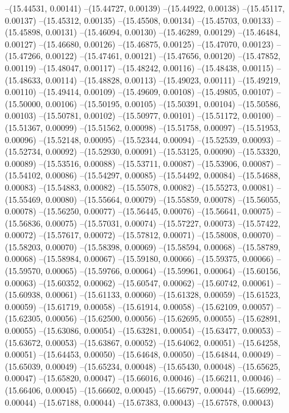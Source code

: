 --(15.44531, 0.00141)
--(15.44727, 0.00139)
--(15.44922, 0.00138)
--(15.45117, 0.00137)
--(15.45312, 0.00135)
--(15.45508, 0.00134)
--(15.45703, 0.00133)
--(15.45898, 0.00131)
--(15.46094, 0.00130)
--(15.46289, 0.00129)
--(15.46484, 0.00127)
--(15.46680, 0.00126)
--(15.46875, 0.00125)
--(15.47070, 0.00123)
--(15.47266, 0.00122)
--(15.47461, 0.00121)
--(15.47656, 0.00120)
--(15.47852, 0.00119)
--(15.48047, 0.00117)
--(15.48242, 0.00116)
--(15.48438, 0.00115)
--(15.48633, 0.00114)
--(15.48828, 0.00113)
--(15.49023, 0.00111)
--(15.49219, 0.00110)
--(15.49414, 0.00109)
--(15.49609, 0.00108)
--(15.49805, 0.00107)
--(15.50000, 0.00106)
--(15.50195, 0.00105)
--(15.50391, 0.00104)
--(15.50586, 0.00103)
--(15.50781, 0.00102)
--(15.50977, 0.00101)
--(15.51172, 0.00100)
--(15.51367, 0.00099)
--(15.51562, 0.00098)
--(15.51758, 0.00097)
--(15.51953, 0.00096)
--(15.52148, 0.00095)
--(15.52344, 0.00094)
--(15.52539, 0.00093)
--(15.52734, 0.00092)
--(15.52930, 0.00091)
--(15.53125, 0.00090)
--(15.53320, 0.00089)
--(15.53516, 0.00088)
--(15.53711, 0.00087)
--(15.53906, 0.00087)
--(15.54102, 0.00086)
--(15.54297, 0.00085)
--(15.54492, 0.00084)
--(15.54688, 0.00083)
--(15.54883, 0.00082)
--(15.55078, 0.00082)
--(15.55273, 0.00081)
--(15.55469, 0.00080)
--(15.55664, 0.00079)
--(15.55859, 0.00078)
--(15.56055, 0.00078)
--(15.56250, 0.00077)
--(15.56445, 0.00076)
--(15.56641, 0.00075)
--(15.56836, 0.00075)
--(15.57031, 0.00074)
--(15.57227, 0.00073)
--(15.57422, 0.00072)
--(15.57617, 0.00072)
--(15.57812, 0.00071)
--(15.58008, 0.00070)
--(15.58203, 0.00070)
--(15.58398, 0.00069)
--(15.58594, 0.00068)
--(15.58789, 0.00068)
--(15.58984, 0.00067)
--(15.59180, 0.00066)
--(15.59375, 0.00066)
--(15.59570, 0.00065)
--(15.59766, 0.00064)
--(15.59961, 0.00064)
--(15.60156, 0.00063)
--(15.60352, 0.00062)
--(15.60547, 0.00062)
--(15.60742, 0.00061)
--(15.60938, 0.00061)
--(15.61133, 0.00060)
--(15.61328, 0.00059)
--(15.61523, 0.00059)
--(15.61719, 0.00058)
--(15.61914, 0.00058)
--(15.62109, 0.00057)
--(15.62305, 0.00056)
--(15.62500, 0.00056)
--(15.62695, 0.00055)
--(15.62891, 0.00055)
--(15.63086, 0.00054)
--(15.63281, 0.00054)
--(15.63477, 0.00053)
--(15.63672, 0.00053)
--(15.63867, 0.00052)
--(15.64062, 0.00051)
--(15.64258, 0.00051)
--(15.64453, 0.00050)
--(15.64648, 0.00050)
--(15.64844, 0.00049)
--(15.65039, 0.00049)
--(15.65234, 0.00048)
--(15.65430, 0.00048)
--(15.65625, 0.00047)
--(15.65820, 0.00047)
--(15.66016, 0.00046)
--(15.66211, 0.00046)
--(15.66406, 0.00045)
--(15.66602, 0.00045)
--(15.66797, 0.00044)
--(15.66992, 0.00044)
--(15.67188, 0.00044)
--(15.67383, 0.00043)
--(15.67578, 0.00043)

